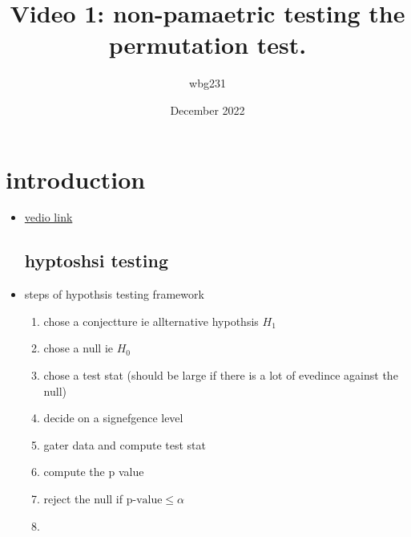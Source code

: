 \documentclass{article}
\title{Video 1: non-pamaetric testing the permutation test. }
\author{wbg231 }
\date{December 2022}
\begin{document}
\maketitle

\section{introduction}
\begin{itemize}
\item \href{https://www.youtube.com/watch?v=frSkAi36qd0}{vedio link}
\subsection{hyptoshsi testing }
\item steps of hypothsis testing framework 
\begin{enumerate}
    \item chose a conjectture ie allternative hypothsis $H_{1}$
    \item chose a null ie $H_{0}$
    \item chose a test stat (should be large if there is a lot of evedince against the null) 
    \item decide on a signefgence level
    \item gater data and compute test stat 
    \item compute the p value 
    \item reject the null if $\text{p-value}\leq \alpha$
    \item 
\end{enumerate}
\end{itemize}
\end{document}
